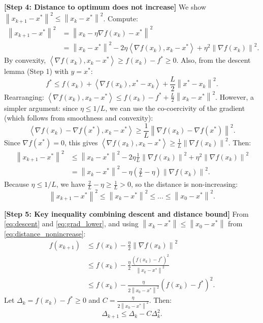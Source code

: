 \documentclass{article}
\newcommand{\norm}[1]{\left\| #1 \right\|}
\newcommand{\inner}[1]{\left\langle #1 \right\rangle}
\newcommand{\step}[1]{\noindent\textbf{[Step #1]}}
\begin{document}
\step{4: Distance to optimum does not increase}
We show $\norm{x_{k+1} - x^*}^2 \le \norm{x_k - x^*}^2$. Compute:
\begin{align}
    \norm{x_{k+1} - x^*}^2 &= \norm{x_k - \eta \nabla f(x_k) - x^*}^2 \\
    &= \norm{x_k - x^*}^2 - 2\eta \inner{\nabla f(x_k), x_k - x^*} + \eta^2 \norm{\nabla f(x_k)}^2.
\end{align}
By convexity, $\inner{\nabla f(x_k), x_k - x^*} \ge f(x_k) - f^* \ge 0$. Also, from the descent lemma (Step 1) with $y = x^*$:
\begin{equation}
    f^* \le f(x_k) + \inner{\nabla f(x_k), x^* - x_k} + \frac{L}{2} \norm{x^* - x_k}^2.
\end{equation}
Rearranging: $\inner{\nabla f(x_k), x_k - x^*} \le f(x_k) - f^* + \frac{L}{2} \norm{x_k - x^*}^2$.
However, a simpler argument: since $\eta \le 1/L$, we can use the co-coercivity of the gradient (which follows from smoothness and convexity):
\begin{equation}
    \inner{\nabla f(x_k) - \nabla f(x^*), x_k - x^*} \ge \frac{1}{L} \norm{\nabla f(x_k) - \nabla f(x^*)}^2.
\end{equation}
Since $\nabla f(x^*) = 0$, this gives $\inner{\nabla f(x_k), x_k - x^*} \ge \frac{1}{L} \norm{\nabla f(x_k)}^2$.
Then:
\begin{align}
    \norm{x_{k+1} - x^*}^2 &\le \norm{x_k - x^*}^2 - 2\eta \frac{1}{L} \norm{\nabla f(x_k)}^2 + \eta^2 \norm{\nabla f(x_k)}^2 \\
    &= \norm{x_k - x^*}^2 - \eta\left(\frac{2}{L} - \eta\right) \norm{\nabla f(x_k)}^2.
\end{align}
Because $\eta \le 1/L$, we have $\frac{2}{L} - \eta \ge \frac{1}{L} > 0$, so the distance is non-increasing:
\begin{equation} \label{eq:distance_nonincrease}
    \norm{x_{k+1} - x^*}^2 \le \norm{x_k - x^*}^2 \le \dots \le \norm{x_0 - x^*}^2.
\end{equation}

\step{5: Key inequality combining descent and distance bound}
From \eqref{eq:descent} and \eqref{eq:grad_lower}, and using $\norm{x_k - x^*} \le \norm{x_0 - x^*}$ from \eqref{eq:distance_nonincrease}:
\begin{align}
    f(x_{k+1}) &\le f(x_k) - \frac{\eta}{2} \norm{\nabla f(x_k)}^2 \\
    &\le f(x_k) - \frac{\eta}{2} \frac{(f(x_k) - f^*)^2}{\norm{x_k - x^*}^2} \\
    &\le f(x_k) - \frac{\eta}{2\norm{x_0 - x^*}^2} (f(x_k) - f^*)^2.
\end{align}
Let $\Delta_k = f(x_k) - f^* \ge 0$ and $C = \frac{\eta}{2\norm{x_0 - x^*}^2}$. Then:
\begin{equation} \label{eq:recurrence}
    \Delta_{k+1} \le \Delta_k - C \Delta_k^2.
\end{equation}
\end{document}
